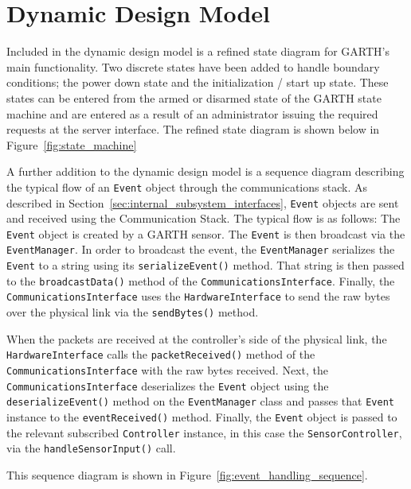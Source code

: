 \documentclass{report}
\begin{document}
\pagebreak
\section{Dynamic Design Model}

Included in the dynamic design model is a refined state diagram for GARTH's
main functionality. Two discrete states have been added to handle boundary
conditions; the power down state and the initialization / start up state. These
states can be entered from the armed or disarmed state of the GARTH state
machine and are entered as a result of an administrator issuing the required
requests at the server interface. The refined state diagram is shown below in
Figure~\ref{fig:state_machine}

A further addition to the dynamic design model is a sequence diagram
describing the typical flow of an \texttt{Event} object through the
communications stack. As described in
Section~\ref{sec:internal_subsystem_interfaces}, \texttt{Event}
objects are sent and received using the Communication Stack. The
typical flow is as follows: The \texttt{Event} object is created by a
GARTH sensor. The \texttt{Event} is then broadcast via the
\texttt{EventManager}. In order to broadcast the event, the
\texttt{EventManager} serializes the \texttt{Event} to a string using
its \texttt{serializeEvent()} method. That string is then passed to
the \texttt{broadcastData()} method of the
\texttt{CommunicationsInterface}. Finally, the
\texttt{CommunicationsInterface} uses the \texttt{HardwareInterface} to
send the raw bytes over the physical link via the \texttt{sendBytes()}
method. 

When the packets are received at the controller's side of the physical
link, the \texttt{HardwareInterface} calls the
\texttt{packetReceived()} method of the
\texttt{CommunicationsInterface} with the raw bytes received. Next,
the \texttt{CommunicationsInterface} deserializes the \texttt{Event}
object using the \texttt{deserializeEvent()} method on the
\texttt{EventManager} class and passes that \texttt{Event} instance to
the \texttt{eventReceived()} method. Finally, the \texttt{Event}
object is passed to the relevant subscribed \texttt{Controller}
instance, in this case the \texttt{SensorController}, via the
\texttt{handleSensorInput()} call.

This sequence diagram is
shown in Figure~\ref{fig:event_handling_sequence}.
\end{document}
